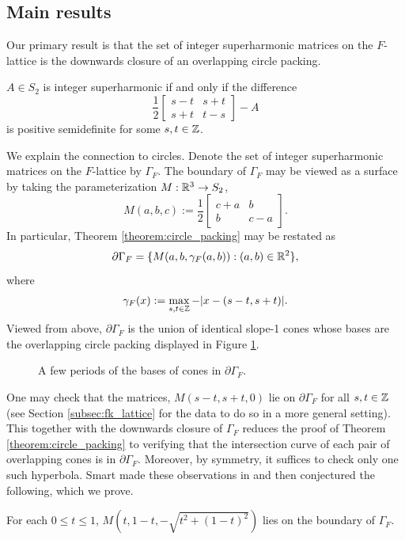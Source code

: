 \documentclass[12pt]{amsart}
\begin{document}
	\subsection{Main results}	
	Our primary result is that the set of integer superharmonic matrices on the $F$-lattice is the downwards closure of an overlapping circle packing. 
\begin{theorem} \label{theorem:circle_packing}
	$A \in S_2$ is integer superharmonic if and only if the difference
	\[
	\frac{1}{2} \begin{bmatrix} s -t & s+t \\ s + t & t-s \end{bmatrix} - A
	\]
	is positive semidefinite for some $s, t \in \mathbb{Z}$. 
\end{theorem}
  	We explain the connection to circles.  
	Denote the set of integer superharmonic matrices on the $F$-lattice by $\Gamma_F$. 
	The boundary of $\Gamma_F$ may be viewed as a surface by taking the parameterization $M: \mathbb{R}^3 \to S_2$,
	\[
	M(a,b,c) := \frac{1}{2} \begin{bmatrix} c+a & b \\ b & c-a \end{bmatrix}.
	\]
 	In particular, Theorem \ref{theorem:circle_packing} may be restated as 
	\[
	\partial \Gamma_F = \{ M(a,b, \gamma_F(a,b)): (a,b) \in \mathbb{R}^2\}, 
	\]
	where 
	\begin{equation}
	\gamma_F(x) := \max_{s,t \in \mathbb{Z}} -|x-(s-t,s+t)|.
	\end{equation}
	Viewed from above, $\partial \Gamma_F$ is the union of identical slope-1 cones whose bases are the overlapping circle packing displayed in Figure \ref{fig:overlapping_packing}.
	
	\begin{figure}
		
		\caption{A few periods of the bases of cones in $\partial \Gamma_F$.} \label{fig:overlapping_packing}
	\end{figure}
	
	One may check that the matrices, 
	$M(s-t, s+t, 0)$ lie on $\partial \Gamma_F$ for all $s,t \in \mathbb{Z}$ (see Section \ref{subsec:fk_lattice} for the data to do so in a more general setting). This together with the downwards closure of $\Gamma_F$ reduces the proof of Theorem \ref{theorem:circle_packing} to verifying that the intersection curve of each pair of overlapping cones is in $\partial \Gamma_F$. Moreover, by
	symmetry, it suffices to check only one such hyperbola.  Smart made these observations in \cite{smart2013aim} and then conjectured the following, 
	which we prove.
	\begin{theorem} \label{theorem:hyperbola}
		For each $0 \leq t \leq 1$, $M(t,1-t, -\sqrt{t^2 + (1-t)^2})$ lies on the boundary of $\Gamma_F$. 
	\end{theorem}
	
\end{document}

